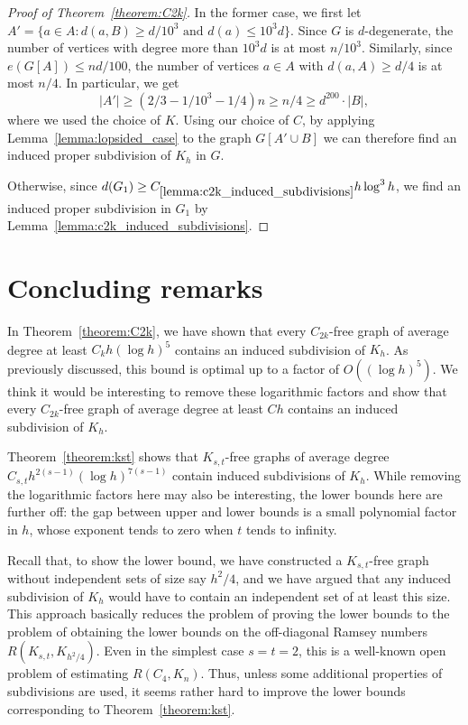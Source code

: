 \documentclass[10pt, a4paper]{article}
\numberwithin{theorem}{section} %
\theoremstyle{remark}
\theoremstyle{definition}
\begin{document}
\begin{proof}[Proof of Theorem~\ref{theorem:C2k}]
    In the former case, we first let $A' = \{ a \in A:d(a, B) \geq d/10^3 \text{ and } d(a) \leq 10^3d\}$.
    Since $G$ is $d$-degenerate, the number of vertices with degree more than $10^3d$ is at most $n/10^3$.
    Similarly, since $e(G[A])\leq nd/100$, the number of vertices $a \in A$ with $d(a, A) \geq d/4$ is at most $n/4$.
    In particular, we get 
    \[
        |A'| \geq (2/3-1/10^3-1/4)n\geq n/4 \geq d^{200}\cdot |B|,
    \]
    where we used the choice of $K$.
    Using our choice of $C$, by applying Lemma~\ref{lemma:lopsided_case} to the graph $G[A' \cup B]$ we can therefore find an induced proper subdivision of $K_h$ in $G$.

    Otherwise, since $d(G_1) \geq C_{\ref{lemma:c2k_induced_subdivisions}}h\log^3h$, we find an induced proper subdivision in $G_1$ by Lemma~\ref{lemma:c2k_induced_subdivisions}.
\end{proof}




\section{Concluding remarks}\label{sec:concluding_remarks}

In Theorem~\ref{theorem:C2k}, we have shown that every $C_{2k}$-free graph of average degree at least $C_k h (\log h)^5$ contains an induced subdivision of $K_h$. As previously discussed, this bound is optimal up to a factor of $O((\log h)^{5})$. We think it would be interesting to remove these logarithmic factors and show that every $C_{2k}$-free graph of average degree at least $Ch$ contains an induced subdivision of $K_h$.

Theorem~\ref{theorem:kst} shows that $K_{s, t}$-free graphs of average degree $C_{s,t} h^{2(s-1)}(\log h)^{7(s-1)}$ contain induced subdivisions of $K_h$. While removing the logarithmic factors here may also be interesting, the lower bounds here are further off: the gap between upper and lower bounds is a small polynomial factor in $h$, whose exponent tends to zero when $t$ tends to infinity.

Recall that, to show the lower bound, we have constructed a $K_{s, t}$-free graph without independent sets of size say $h^2/4$, and we have argued that any induced subdivision of $K_h$ would have to contain an independent set of at least this size. This approach basically reduces the problem of proving the lower bounds to the problem of obtaining the lower bounds on the off-diagonal Ramsey numbers $R(K_{s, t}, K_{h^2/4})$. Even in the simplest case $s=t=2$, this is a well-known open problem of estimating $R(C_4, K_n)$. Thus, unless some additional properties of subdivisions are used, it seems rather hard to improve the lower bounds corresponding to Theorem~\ref{theorem:kst}.
\end{document}
